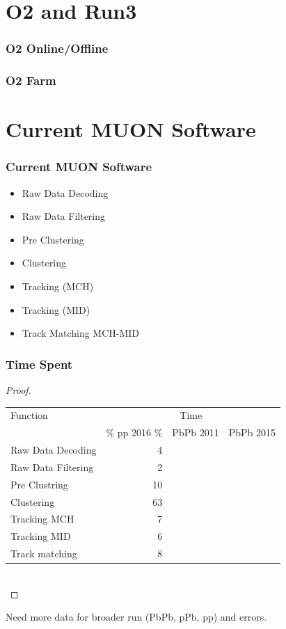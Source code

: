 \documentclass{beamer}
\begin{document}
\section{O2 and Run3}
\begin{frame}
\frametitle{O2 Online/Offline}


\end{frame}
\begin{frame}
  \frametitle{O2 Farm}

\end{frame}

\section{Current MUON Software}

\begin{frame}
\frametitle{Current MUON Software}


\begin{itemize}
  \item Raw Data Decoding
  \item Raw Data Filtering
  \item Pre Clustering
  \item Clustering
  \item Tracking (MCH)
  \item Tracking (MID)
  \item Track Matching MCH-MID
\end{itemize}
\end{frame}


\begin{frame}
  \frametitle{Time Spent}
\begin{proof}

\begin{tabular}{|l|r|r|r|}
  Function & \multicolumn{3}{c}{Time} \\  
  & \% pp 2016 \% & PbPb 2011 & PbPb 2015\\ \hline 
Raw Data Decoding & 4 & &\\
Raw Data Filtering & 2 & &\\
Pre Clustring & 10 & &\\
Clustering & 63 & & \\
Tracking MCH & 7 & & \\
Tracking MID & 6 & & \\
Track matching & 8 & & \\
\end{tabular}\\
\end{proof}

Need more data for broader run (PbPb, pPb, pp) and errors.
\end{frame}
\end{document}
